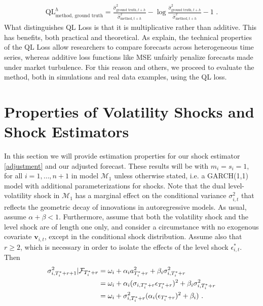 \documentclass[11pt,3p,review,authoryear]{elsarticle}
\newcommand{\x}{\textbf{v}}
\def\mc#1{\mathcal{#1}} %
\def\mc#1{\mathcal{#1}}
\theoremstyle{definition}
\begin{document}
\begin{align*}
\text{QL}^{h}_{\text{method, ground truth}} = \frac{\hat\sigma^{2}_{\text{ground truth},t+h}}{ \hat\sigma^{2}_{\text{method},t+h}} - \log{\frac{\hat\sigma^{2}_{\text{ground truth},t+h}}{ \hat\sigma^{2}_{\text{method},t+h}}} -1 \text{ .}
\end{align*}
What distinguishes QL Loss is that it is multiplicative rather than additive.  This has benefits, both practical and theoretical.  As \citet{brownlees2011practical} explain, the technical properties of the QL Loss allow researchers to compare forecasts across heterogeneous time series, whereas additive loss functions like MSE unfairly penalize forecasts made under market turbulence.  For this reason and others, we proceed to evaluate the method, both in simulations and real data examples, using the QL loss.

\section{Properties of Volatility Shocks and Shock Estimators}\label{SVF_properties}

In this section we will provide estimation properties for our shock  estimator \eqref{adjustment} and our adjusted forecast. These results will be with $m_i = s_i = 1$, for all $i = 1,\ldots,n+1$ in model $\mc{M}_1$ unless otherwise stated, i.e. a GARCH(1,1) model with additional parameterizations for shocks. Note that the dual level-volatility shock in $\mc{M}_1$ has a marginal effect on the conditional variance $\sigma^{2}_{i,t}$ that reflects the geometric decay of innovations in autoregressive models.  As usual, assume $\alpha+\beta < 1$.  Furthermore, assume that both the volatility shock and the level shock are of length one only, and consider a circumstance with no exogenous covariate $\x_{i,t}$, except in the conditional shock distribution. Assume also that $r\geq 2$, which is necessary in order to isolate the effects of the level shock $\epsilon^{*}_{i,t}$.  Then
\begin{align}
\sigma^{2}_{i,T_{i}^{*}+r+1} | \mathcal{F}_{T_{i}^{*}+r} & = \omega_{i} + \alpha_{i} a_{T_{i}^{*}+r}^{2} + \beta_{i}\sigma^{2}_{i,T_{i}^{*}+r} \label{eq0}\\
& = \omega_{i} + \alpha_{i}(\sigma_{i,T_{i}^{*}+r}\epsilon_{T_{i}^{*}+r})^{2} + \beta_{i}\sigma^{2}_{i,T_{i}^{*}+r}\notag \\
& = \omega_{i} + \sigma^{2}_{i,T_{i}^{*}+r}(\alpha_{i} (\epsilon_{T_{i}^{*}+r})^{2} + \beta_{i}) \text{ .}\notag 
\end{align}
\end{document}
